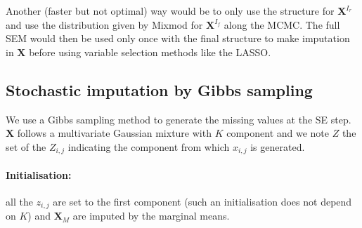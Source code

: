 \documentclass[12pt,a4paper]{report}
\begin{document}
		
Another (faster but not optimal) way would be to only use the structure for $\boldsymbol{X}^{I_r}$ and use the distribution given by Mixmod for $\boldsymbol{X}^{I_f}$ along the MCMC. The full SEM would then be used only once with the final structure to make imputation in $\boldsymbol{X}$ before using variable selection methods like the LASSO.


	\subsection{Stochastic imputation by Gibbs sampling}
		We use a Gibbs sampling method to generate the missing values at the SE step. $\boldsymbol{X}$ follows a multivariate Gaussian mixture with $K$ component and we note $Z$ the set of the $Z_{i,j}$ indicating the component from which $x_{i,j}$ is generated.
		\paragraph{Initialisation:} all the $z_{i,j}$ are set to the first component (such an initialisation does not depend on $K$) and $\boldsymbol{X}_M$ are imputed by the marginal means.
\end{document}
